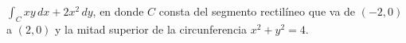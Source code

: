 \item $\int_C xy \, dx + 2x^2 \, dy$, en donde $C$ consta del segmento rectilíneo que va de $(-2, 0)$ a $(2, 0)$ y la mitad superior de la circunferencia $x^2 + y^2 = 4$.
